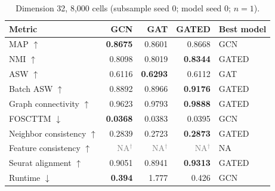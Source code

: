 \documentclass[10pt]{article}
\begin{document}
\begin{table}[H]\centering\small
\caption{Dimension 32, 8,000 cells (subsample seed 0; model seed 0; $n=1$).}
\begin{tabular}{@{}lrrrl@{}}\toprule
Metric & GCN & GAT & GATED & Best model \\\midrule
MAP $\uparrow$ & \textbf{0.8675} & 0.8601 & 0.8668 & GCN \\
NMI $\uparrow$ & 0.8098 & 0.8019 & \textbf{0.8344} & GATED \\
ASW $\uparrow$ & 0.6116 & \textbf{0.6293} & 0.6112 & GAT \\
Batch ASW $\uparrow$ & 0.8892 & 0.8966 & \textbf{0.9176} & GATED \\
Graph connectivity $\uparrow$ & 0.9623 & 0.9793 & \textbf{0.9888} & GATED \\
FOSCTTM $\downarrow$ & \textbf{0.0368} & 0.0383 & 0.0395 & GCN \\
Neighbor consistency $\uparrow$ & 0.2839 & 0.2723 & \textbf{0.2873} & GATED \\
Feature consistency $\uparrow$ & \textcolor{gray}{NA$^{\dagger}$} & \textcolor{gray}{NA$^{\dagger}$} & \textcolor{gray}{NA$^{\dagger}$} & NA \\
Seurat alignment $\uparrow$ & 0.9051 & 0.8941 & \textbf{0.9313} & GATED \\
Runtime $\downarrow$ & \textbf{0.394} & 1.777 & 0.426 & GCN \\
\bottomrule\end{tabular}
\end{table}
\end{document}
